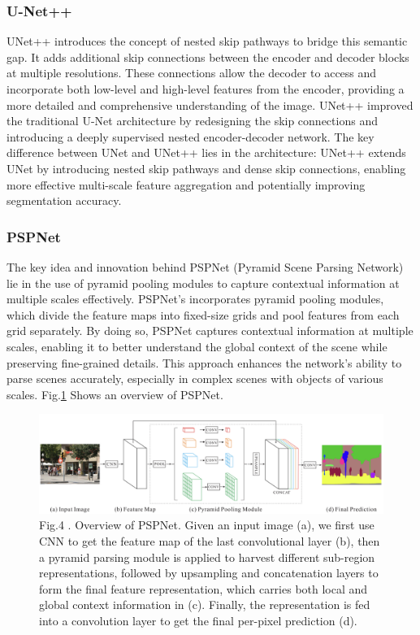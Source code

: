 \documentclass[12pt]{article}
\begin{document}
	
	
	\subsubsection{U-Net++}
	UNet++ introduces the concept of nested skip pathways to bridge this semantic gap. It adds additional skip connections between the encoder and decoder blocks at multiple resolutions. These connections allow the decoder to access and incorporate both low-level and high-level features from the encoder, providing a more detailed and comprehensive understanding of the image.  UNet++ improved the traditional U-Net architecture by redesigning the skip connections and introducing a deeply supervised nested encoder-decoder network. The key difference between UNet and UNet++ lies in the architecture: UNet++ extends UNet by introducing nested skip pathways and dense skip connections, enabling more effective multi-scale feature aggregation and potentially improving segmentation accuracy.
	
	\subsubsection{PSPNet}
	The key idea and innovation behind PSPNet (Pyramid Scene Parsing Network) lie in the use of pyramid pooling modules to capture contextual information at multiple scales effectively. PSPNet's incorporates pyramid pooling modules, which divide the feature maps into fixed-size grids and pool features from each grid separately. By doing so, PSPNet captures contextual information at multiple scales, enabling it to better understand the global context of the scene while preserving fine-grained details. This approach enhances the network's ability to parse scenes accurately, especially in complex scenes with objects of various scales. Fig.\ref{fig:PSPNet} Shows an overview of PSPNet.
 	
\begin{center}
\begin{figure}[H]
\centering
\includegraphics[width=1\textwidth]{Figs/PSPNet}
\caption{Fig.4 . Overview of PSPNet. Given an input image (a), we first use CNN to get the feature map of the last convolutional layer (b), then a pyramid parsing module is applied to harvest different sub-region representations, followed by upsampling and concatenation layers to form the final feature representation, which carries both local and global context information in (c). Finally, the representation is fed into a convolution layer to get the final per-pixel prediction (d).}
\label{fig:PSPNet}
\end{figure}
\end{center}
	
\end{document}
